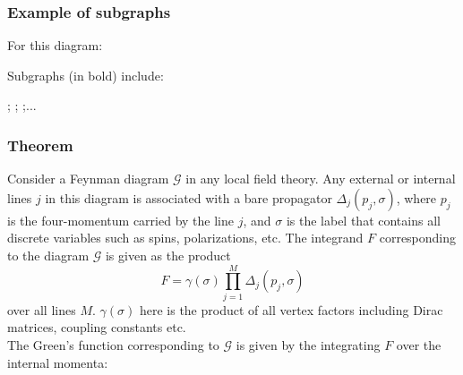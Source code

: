 \documentclass{article}
\begin{document}
\subsubsection{Example of subgraphs}
For this diagram:
\begin{center}
\end{center}
Subgraphs (in bold) include:\\
\begin{center}    
    ;
    ;
    ;...\\
\end{center}

\subsubsection{Theorem}
Consider a Feynman diagram $\mathcal{G}$ in any local field theory. Any external or internal lines $j$ in this diagram is associated with a bare propagator $\Delta_j(p_j,\sigma)$, where $p_j$ is the four-momentum carried by the line $j$, and $\sigma$ is the label that contains all discrete variables such as spins, polarizations, etc. The integrand $F$ corresponding to the diagram $\mathcal{G}$  is given as the product
\begin{equation}
    F= \gamma(\sigma)\prod_{j=1}^M \Delta_j(p_j,\sigma)
\end{equation}
over all lines $M$. $\gamma(\sigma)$ here is the product of all vertex factors including Dirac matrices, coupling constants etc. \\

The Green's function corresponding to $\mathcal{G}$ is given by the integrating $F$ over the internal momenta:
\end{document}
